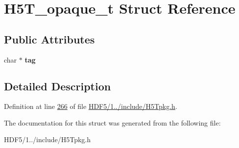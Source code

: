 \hypertarget{struct_h5_t__opaque__t}{}\section{H5\+T\+\_\+opaque\+\_\+t Struct Reference}
\label{struct_h5_t__opaque__t}
\subsection*{Public Attributes}
\begin{DoxyCompactItemize}
\item 
\mbox{\label{struct_h5_t__opaque__t_ab1f767627b9abe7645dffd212a4f81b5}} 
char $\ast$ {\bfseries tag}
\end{DoxyCompactItemize}


\subsection{Detailed Description}


Definition at line \hyperlink{_h_d_f5_21_810_81_2include_2_h5_tpkg_8h_source_l00266}{266} of file \hyperlink{_h_d_f5_21_810_81_2include_2_h5_tpkg_8h_source}{H\+D\+F5/1../include/\+H5\+Tpkg.\+h}.



The documentation for this struct was generated from the following file\+:\begin{DoxyCompactItemize}
\item 
H\+D\+F5/1../include/\+H5\+Tpkg.\+h\end{DoxyCompactItemize}
